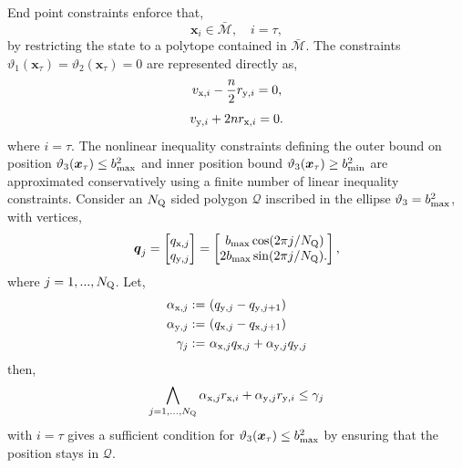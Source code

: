 \documentclass[twocolumn,letterpaper]{IEEEAerospaceCLS}  %
\theoremstyle{definition}
\begin{document}
End point constraints enforce that, 
\begin{equation} \label{eq: xtau in Mbar}
  \boldsymbol{x}_i \in \bar{{\mathcal{M}}}, \quad i=\tau, 
\end{equation}
by restricting the state to a polytope contained in $\bar{{\mathcal{M}}}$. 
The constraints $\vartheta_1(\boldsymbol{x}_\tau)=\vartheta_2(\boldsymbol{x}_\tau)=0$ are represented directly as, 
\begin{equation} \label{eq: MIP end pt const 1}
  v_{{\rm x},i} - \frac{n}{2} r_{{\rm y},i} = 0,
\end{equation}
\begin{equation} \label{eq: MIP end pt const 2}
  v_{{\rm y},i} + 2n r_{{\rm x},i} = 0 .
\end{equation}
where $i=\tau$. 
The nonlinear inequality constraints defining the outer bound on position $\vartheta_3(\boldsymbol{x}_\tau)\leq b_{\rm max}^2$ and inner position bound $\vartheta_3(\boldsymbol{x}_\tau)\geq b_{\rm min}^2$ are approximated conservatively using a finite number of linear inequality constraints. 
Consider an $N_{\rm Q}$ sided polygon $\mathcal{Q}$ inscribed in the ellipse $\vartheta_3 = b_{\rm max}^2$, with vertices, 
\begin{equation*}
  \boldsymbol{q}_{j}
  =
  \begin{bmatrix}
  q_{{\rm x},j} \\
  q_{{\rm y},j}
  \end{bmatrix}
  = 
  \begin{bmatrix}
  \, b_{\rm max} \cos({2\pi j }/{N_{\rm Q}}) \\ 
  2b_{\rm max} \sin({2\pi j }/{N_{\rm Q}}). 
  \end{bmatrix}
  ,
\end{equation*}
where $j=1,...,N_{\rm Q}$. 
Let, 
\begin{align*}
  \alpha_{{\rm x}, j} := & \,\,(q_{{\rm y},j}-q_{{\rm y},j+1}) \\ 
  \alpha_{{\rm y}, j} := & \,\,(q_{{\rm x},j}-q_{{\rm x},j+1}) \\ 
  \gamma_j := & \,\, \alpha_{{\rm x}, j} q_{{\rm x},j} + \alpha_{{\rm y}, j} q_{{\rm y},j}
\end{align*}
then, 
\begin{equation} \label{eq: MIP end pt const 3}
  \bigwedge_{j=1,...,N_{\rm Q}} \alpha_{{\rm x}, j} r_{{\rm x},i}+ \alpha_{{\rm y}, j} r_{{\rm y},i} \leq \gamma_j
\end{equation}
with $i=\tau$ gives a sufficient condition for $\vartheta_3(\boldsymbol{x}_\tau)\leq b_{\rm max}^2$ by ensuring that the position stays in $\mathcal{Q}$. 
\end{document}
